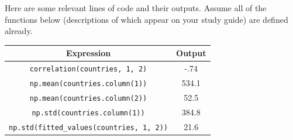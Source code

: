 Here are some relevant lines of code and their outputs. Assume all of the functions below (descriptions of which appear on your study guide) are defined already. 

\begin{center}
 \begin{tabular}{||c c ||} 
 \hline
 Expression & Output\\ [0.5ex] 
 \hline\hline
 {\tt correlation(countries, 1, 2)} & -.74 \\ 
 \hline
 {\tt np.mean(countries.column(1))} & 534.1\\
 \hline
 {\tt np.mean(countries.column(2))} & 52.5\\
 \hline
 {\tt np.std(countries.column(1))} & 384.8\\
 \hline
 {\tt np.std(fitted\_values(countries, 1, 2))} & 21.6 \\ [1ex] 
 \hline
\end{tabular}
\end{center}


